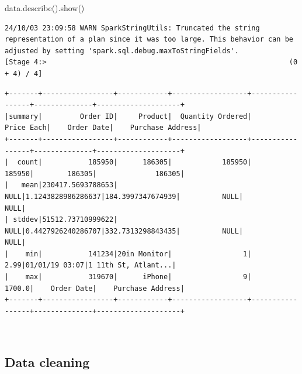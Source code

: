 \documentclass[
  letterpaper,
  DIV=11,
  numbers=noendperiod]{scrartcl}
\newenvironment{Shaded}{\begin{snugshade}}{\end{snugshade}}
\newcommand{\NormalTok}[1]{\textcolor[rgb]{0.00,0.23,0.31}{#1}}
\begin{document}
\begin{Shaded}
\begin{Highlighting}[]
\NormalTok{data.describe().show()}
\end{Highlighting}
\end{Shaded}

\begin{verbatim}
24/10/03 23:09:58 WARN SparkStringUtils: Truncated the string representation of a plan since it was too large. This behavior can be adjusted by setting 'spark.sql.debug.maxToStringFields'.
[Stage 4:>                                                          (0 + 4) / 4]
\end{verbatim}

\begin{verbatim}
+-------+-----------------+------------+------------------+-----------------+--------------+--------------------+
|summary|         Order ID|     Product|  Quantity Ordered|       Price Each|    Order Date|    Purchase Address|
+-------+-----------------+------------+------------------+-----------------+--------------+--------------------+
|  count|           185950|      186305|            185950|           185950|        186305|              186305|
|   mean|230417.5693788653|        NULL|1.1243828986286637|184.3997347674939|          NULL|                NULL|
| stddev|51512.73710999622|        NULL|0.4427926240286707|332.7313298843435|          NULL|                NULL|
|    min|           141234|20in Monitor|                 1|             2.99|01/01/19 03:07|1 11th St, Atlant...|
|    max|           319670|      iPhone|                 9|           1700.0|    Order Date|    Purchase Address|
+-------+-----------------+------------+------------------+-----------------+--------------+--------------------+
\end{verbatim}

\begin{verbatim}
                                                                                
\end{verbatim}

\subsection{Data cleaning}\label{data-cleaning}
\end{document}
